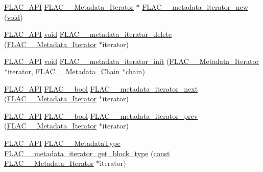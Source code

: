 \begin{DoxyCompactItemize}
\item 
\hyperlink{group__flac__export_ga56ca07df8a23310707732b1c0007d6f5}{F\+L\+A\+C\+\_\+\+A\+PI} \hyperlink{struct_f_l_a_c_____metadata___iterator}{F\+L\+A\+C\+\_\+\+\_\+\+Metadata\+\_\+\+Iterator} $\ast$ \hyperlink{group__flac__metadata__level2_gac988906d63bd2ddc910d8f0b118591f7}{F\+L\+A\+C\+\_\+\+\_\+metadata\+\_\+iterator\+\_\+new} (\hyperlink{sound_8c_ae35f5844602719cf66324f4de2a658b3}{void})
\item 
\hyperlink{group__flac__export_ga56ca07df8a23310707732b1c0007d6f5}{F\+L\+A\+C\+\_\+\+A\+PI} \hyperlink{sound_8c_ae35f5844602719cf66324f4de2a658b3}{void} \hyperlink{group__flac__metadata__level2_ga1af713d0ae3f7b761579b4fac64f0a9e}{F\+L\+A\+C\+\_\+\+\_\+metadata\+\_\+iterator\+\_\+delete} (\hyperlink{struct_f_l_a_c_____metadata___iterator}{F\+L\+A\+C\+\_\+\+\_\+\+Metadata\+\_\+\+Iterator} $\ast$iterator)
\item 
\hyperlink{group__flac__export_ga56ca07df8a23310707732b1c0007d6f5}{F\+L\+A\+C\+\_\+\+A\+PI} \hyperlink{sound_8c_ae35f5844602719cf66324f4de2a658b3}{void} \hyperlink{group__flac__metadata__level2_ga4a5af69a1f19436b02f738eb8c97c959}{F\+L\+A\+C\+\_\+\+\_\+metadata\+\_\+iterator\+\_\+init} (\hyperlink{struct_f_l_a_c_____metadata___iterator}{F\+L\+A\+C\+\_\+\+\_\+\+Metadata\+\_\+\+Iterator} $\ast$iterator, \hyperlink{struct_f_l_a_c_____metadata___chain}{F\+L\+A\+C\+\_\+\+\_\+\+Metadata\+\_\+\+Chain} $\ast$chain)
\item 
\hyperlink{group__flac__export_ga56ca07df8a23310707732b1c0007d6f5}{F\+L\+A\+C\+\_\+\+A\+PI} \hyperlink{ordinals_8h_a95103469f1cbd78b8cf250194985b34e}{F\+L\+A\+C\+\_\+\+\_\+bool} \hyperlink{group__flac__metadata__level2_ga3997509ae7eeea3b208700cdbbbd97ed}{F\+L\+A\+C\+\_\+\+\_\+metadata\+\_\+iterator\+\_\+next} (\hyperlink{struct_f_l_a_c_____metadata___iterator}{F\+L\+A\+C\+\_\+\+\_\+\+Metadata\+\_\+\+Iterator} $\ast$iterator)
\item 
\hyperlink{group__flac__export_ga56ca07df8a23310707732b1c0007d6f5}{F\+L\+A\+C\+\_\+\+A\+PI} \hyperlink{ordinals_8h_a95103469f1cbd78b8cf250194985b34e}{F\+L\+A\+C\+\_\+\+\_\+bool} \hyperlink{group__flac__metadata__level2_ga003373a88bea6cea2df32f110a95e912}{F\+L\+A\+C\+\_\+\+\_\+metadata\+\_\+iterator\+\_\+prev} (\hyperlink{struct_f_l_a_c_____metadata___iterator}{F\+L\+A\+C\+\_\+\+\_\+\+Metadata\+\_\+\+Iterator} $\ast$iterator)
\item 
\hyperlink{group__flac__export_ga56ca07df8a23310707732b1c0007d6f5}{F\+L\+A\+C\+\_\+\+A\+PI} \hyperlink{group__flac__format_gac71714ba8ddbbd66d26bb78a427fac01}{F\+L\+A\+C\+\_\+\+\_\+\+Metadata\+Type} \hyperlink{group__flac__metadata__level2_ga8221ea86b62119785c774aaece48a29b}{F\+L\+A\+C\+\_\+\+\_\+metadata\+\_\+iterator\+\_\+get\+\_\+block\+\_\+type} (\hyperlink{getopt1_8c_a2c212835823e3c54a8ab6d95c652660e}{const} \hyperlink{struct_f_l_a_c_____metadata___iterator}{F\+L\+A\+C\+\_\+\+\_\+\+Metadata\+\_\+\+Iterator} $\ast$iterator)

\end{DoxyCompactItemize}

